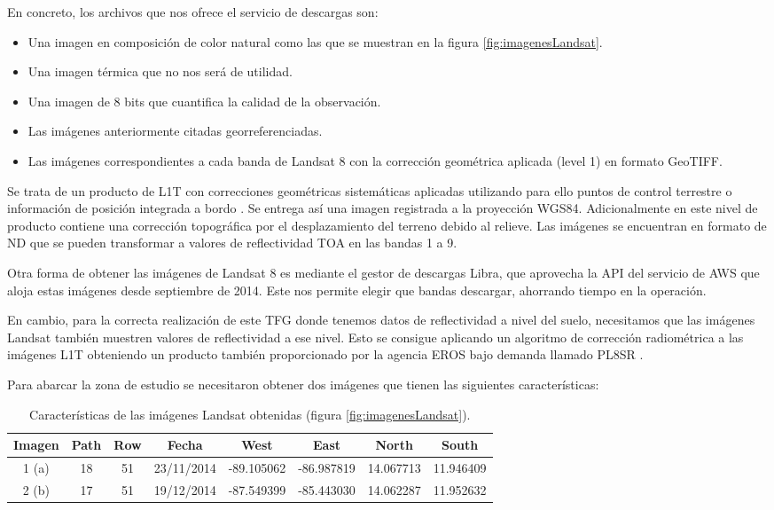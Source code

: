 En concreto, los archivos que nos ofrece el servicio de descargas son:

\begin{itemize}
	\item Una imagen en composición de color natural como las que se muestran en la figura \ref{fig:imagenesLandsat}.
	\item Una imagen térmica que no nos será de utilidad.
	\item Una imagen de 8 bits que cuantifica la calidad de la observación.
	\item Las imágenes anteriormente citadas georreferenciadas.
	\item Las imágenes correspondientes a cada banda de Landsat 8 con la corrección geométrica aplicada (level 1) en formato GeoTIFF.
\end{itemize}\Sep

Se trata de un producto de \ac{L1T} con correcciones geométricas sistemáticas aplicadas utilizando para ello puntos de control terrestre o información de posición integrada a bordo \citep{Ariza2013}. Se entrega así una imagen registrada a la proyección WGS84. Adicionalmente en este nivel de producto contiene una corrección topográfica por el desplazamiento del terreno debido al relieve. Las imágenes se encuentran en formato de \ac{ND} que se pueden transformar a valores de reflectividad \ac{TOA} en las bandas 1 a 9.\Sep

Otra forma de obtener las imágenes de Landsat 8 es mediante el gestor de descargas Libra, que aprovecha la API del servicio de \ac{AWS} que aloja estas imágenes desde septiembre de 2014. Este nos permite elegir que bandas descargar, ahorrando tiempo en la operación.\Sep

En cambio, para la correcta realización de este \ac{TFG} donde tenemos datos de reflectividad a nivel del suelo, necesitamos que las imágenes Landsat también muestren valores de reflectividad a ese nivel. Esto se consigue aplicando un algoritmo de corrección radiométrica a las imágenes \ac{L1T} obteniendo un producto también proporcionado por la agencia \ac{EROS} bajo demanda llamado \ac{PL8SR} \citep{USGS2015}.\Sep

Para abarcar la zona de estudio se necesitaron obtener dos imágenes que tienen las siguientes características:

\begin{table}[ht]
	\centering
	\caption[Caracerísticas de las imágenes Landsat]{Características de las imágenes Landsat obtenidas (figura \ref{fig:imagenesLandsat}).}
	\begin{tabular}{@{}cccccccc@{}}
	\toprule[0.4mm]
	Imagen & Path & Row & Fecha & West & East & North & South \\
	\midrule
	1 (a) & 18 & 51 & 23/11/2014 & -89.105062 & -86.987819 & 14.067713 & 11.946409 \\
	2 (b) & 17 & 51 & 19/12/2014 & -87.549399 & -85.443030 & 14.062287 & 11.952632 \\
	\bottomrule[0.4mm]
	\end{tabular}
	\label{tab:imagenes}
\end{table}

